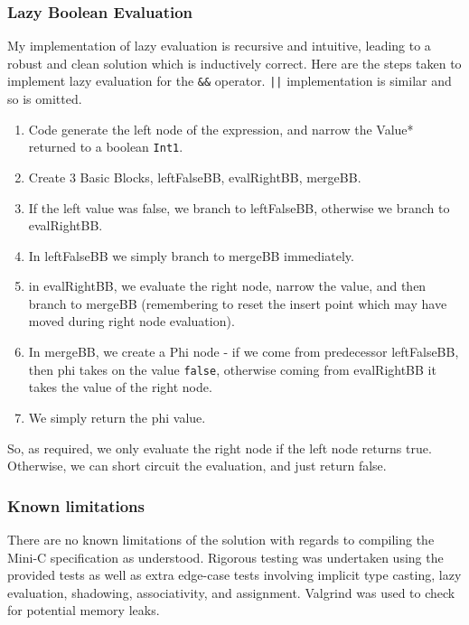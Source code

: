 \documentclass[10pt,a4paper]{article}
\newcommand{\code}[1]{\lstinline!#1!}
\begin{document}
\subsubsection*{Lazy Boolean Evaluation}
My implementation of lazy evaluation is recursive and intuitive, leading to a robust and clean solution which is inductively correct. Here are the steps taken to implement lazy evaluation for the \code{&&} operator. \code{||} implementation is similar and so is omitted.
\begin{enumerate}
    \item Code generate the left node of the expression, and narrow the Value* returned to a boolean \code{Int1}.
    \item Create 3 Basic Blocks, leftFalseBB, evalRightBB, mergeBB.
    \item If the left value was false, we branch to leftFalseBB, otherwise we branch to evalRightBB.
    \item In leftFalseBB we simply branch to mergeBB immediately.
    \item in evalRightBB, we evaluate the right node, narrow the value, and then branch to mergeBB (remembering to reset the insert point which may have moved during right node evaluation).
    \item In mergeBB, we create a Phi node - if we come from predecessor leftFalseBB, then phi takes on the value \code{false}, otherwise coming from evalRightBB it takes the value of the right node.
    \item We simply return the phi value.
\end{enumerate}
So, as required, we only evaluate the right node if the left node returns true. Otherwise, we can short circuit the evaluation, and just return false.
\subsubsection*{Known limitations}
There are no known limitations of the solution with regards to compiling the Mini-C specification as understood. Rigorous testing was undertaken using the provided tests as well as extra edge-case tests involving implicit type casting, lazy evaluation, shadowing, associativity, and assignment. Valgrind was used to check for potential memory leaks.
\newpage


\nocite{*}


\newpage
\end{document}
